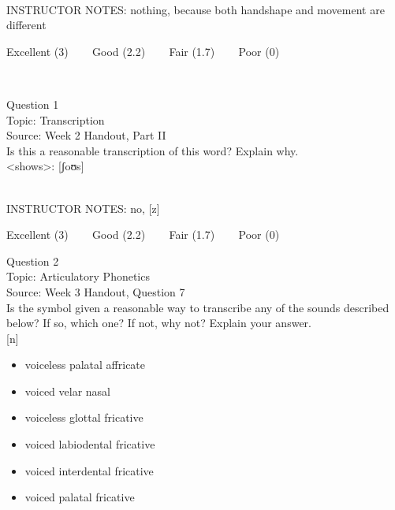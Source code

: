 \documentclass[12pt]{article}
\begin{document}
~\\
INSTRUCTOR NOTES: nothing, because both handshape and movement are different


\vfill
Excellent (3) ~~~ Good (2.2) ~~~ Fair (1.7) ~~~ Poor (0)
\newpage

\begin{center}
\textbf{{\color{red}{\HUGE END OF EXAM}}}\\

\end{center}
\newpage

\begin{center}
\textbf{{\color{blue}{\HUGE START OF EXAM\\}}}

\textbf{{\color{blue}{\HUGE Student ID: 67444\\}}}

\textbf{{\color{blue}{\HUGE \\}}}

\end{center}
\newpage

{\large Question 1}\\

Topic: Transcription\\
Source: Week 2 Handout, Part II\\

Is this a reasonable transcription of this word? Explain why.\\

<shows>: {[ʃoʊs]}


~\\
INSTRUCTOR NOTES: no, [z]


\vfill
Excellent (3) ~~~ Good (2.2) ~~~ Fair (1.7) ~~~ Poor (0)
\newpage

{\large Question 2}\\

Topic: Articulatory Phonetics\\
Source: Week 3 Handout, Question 7\\

Is the symbol given a reasonable way to transcribe any of the sounds described below? If so, which one? If not, why not? Explain your answer.\\

{[n]}

\begin{itemize} \item voiceless palatal affricate \item voiced velar nasal \item voiceless glottal fricative \item voiced labiodental fricative \item voiced interdental fricative \item voiced palatal fricative \end{itemize}
\end{document}
